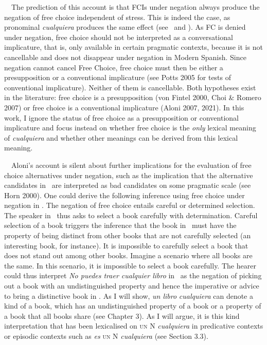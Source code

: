 \begin{styleStandard}
\ \ The prediction of this account is that FCIs under negation always produce the negation of free choice independent of stress. This is indeed the case, as pronominal \textit{cualquiera} produces the same effect (see \ and ). As FC is denied under negation, free choice should not be interpreted as a conversational implicature, that is, only available in certain pragmatic contexts, because it is not cancellable and does not disappear under negation in Modern Spanish. Since negation cannot cancel Free Choice, free choice must then be either a presupposition or a conventional implicature (see Potts 2005 for tests of conventional implicature). Neither of them is cancellable. Both hypotheses exist in the literature: free choice is a presupposition (von Fintel 2000, Choi \& Romero 2007) or free choice is a conventional implicature (Aloni 2007, 2021). In this work, I ignore the status of free choice as a presupposition or conventional implicature and focus instead on whether free choice is the \textit{only} lexical meaning of \textit{cualquiera} and whether other meanings can be derived from this lexical meaning. 
\end{styleStandard}

\begin{styleStandard}
\ \ Aloni’s account is silent about further implications for the evaluation of free choice alternatives under negation, such as the implication that the alternative candidates in \ are interpreted as bad candidates on some pragmatic scale (see Horn 2000). One could derive the following inference using free choice under negation in . The negation of free choice entails careful or determined selection. The speaker in \ thus asks to select a book carefully with determination. Careful selection of a book triggers the inference that the book in \ must have the property of being distinct from other books that are not carefully selected (an interesting book, for instance). It is impossible to carefully select a book that does not stand out among other books. Imagine a scenario where all books are the same. In this scenario, it is impossible to select a book carefully. The hearer could thus interpret \textit{No puedes traer cualquier libro} in \ as the negation of picking out a book with an undistinguished property and hence the imperative or advice to bring a distinctive book in . As I will show, \textit{un libro} \textit{cualquiera} can denote a kind of a book, which has an undistinguished property of a book or a property of a book that all books share (see Chapter 3). As I will argue, it is this kind interpretation that has been lexicalised on \textsc{un} N \textit{cualquiera} in predicative contexts or episodic contexts such as \textit{es }\textsc{un}\textit{ }N\textit{ cualquiera} (see Section 3.3). 
\end{styleStandard}


